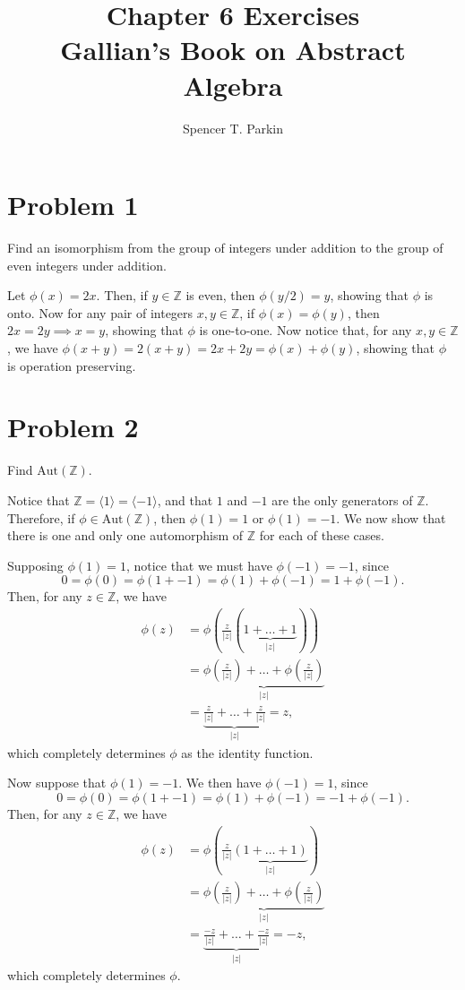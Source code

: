 \documentclass[12pt]{article}
\title{Chapter 6 Exercises\\Gallian's Book on Abstract Algebra}
\author{Spencer T. Parkin}
\newcommand{\Z}{\mathbb{Z}}
\newcommand{\aut}{\mbox{Aut}}
\begin{document}
\maketitle

\section*{Problem 1}

Find an isomorphism from the group of integers under addition
to the group of even integers under addition.

Let $\phi(x)=2x$.  Then, if $y\in\Z$ is even, then
$\phi(y/2)=y$, showing that $\phi$ is onto.
Now for any pair of integers $x,y\in\Z$, if
$\phi(x)=\phi(y)$, then $2x=2y\implies x=y$, showing
that $\phi$ is one-to-one.  Now notice that, for any $x,y\in\Z$,
we have $\phi(x+y)=2(x+y)=2x+2y=\phi(x)+\phi(y)$, showing
that $\phi$ is operation preserving.

\section*{Problem 2}

Find $\aut(\Z)$.

Notice that $\Z=\langle 1\rangle=\langle -1\rangle$, and that $1$ and $-1$ are
the only generators of $\Z$.  Therefore, if $\phi\in\aut(\Z)$, then
$\phi(1)=1$ or $\phi(1)=-1$.  We now show that there is one and only
one automorphism of $\Z$ for each of these cases.

Supposing $\phi(1)=1$, notice that we must have $\phi(-1)=-1$,
since
\begin{equation*}
0=\phi(0)=\phi(1+-1)=\phi(1)+\phi(-1)=1+\phi(-1).
\end{equation*}
Then, for any $z\in\Z$, we have
\begin{align*}
\phi(z) &= \phi\left(\frac{z}{|z|}(\underbrace{1+\dots+1}_{|z|})\right) \\
 &=\underbrace{\phi\left(\frac{z}{|z|}\right)+\dots+\phi\left(\frac{z}{|z|}\right)}_{|z|} \\
 &=\underbrace{\frac{z}{|z|}+\dots+\frac{z}{|z|}}_{|z|}=z,
\end{align*}
which completely determines $\phi$ as the identity function.

Now suppose that $\phi(1)=-1$.  We then have $\phi(-1)=1$, since
\begin{equation*}
0 = \phi(0) = \phi(1+-1)=\phi(1)+\phi(-1)=-1+\phi(-1).
\end{equation*}
Then, for any $z\in \Z$, we have
\begin{align*}
\phi(z) &= \phi\left(\frac{z}{|z|}\underbrace{(1+\dots+1)}_{|z|}\right) \\
 &= \underbrace{\phi\left(\frac{z}{|z|}\right)+\dots+\phi\left(\frac{z}{|z|}\right)}_{|z|} \\
 &= \underbrace{\frac{-z}{|z|}+\dots+\frac{-z}{|z|}}_{|z|}=-z,
\end{align*}
which completely determines $\phi$.
\end{document}
